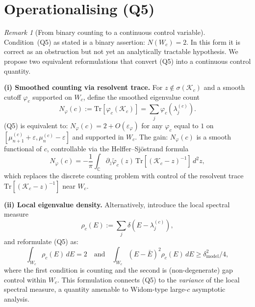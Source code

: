 \documentclass[12pt,a4paper]{amsart}
\theoremstyle{definition}
\theoremstyle{remark}
\newtheorem{remark}[theorem]{Remark}
\newcommand{\Kc}{\mathcal{K}_c}
\newcommand{\lam}[2]{\lambda_{#2}^{(#1)}}
\newcommand{\Tr}{\mathrm{Tr}}
\begin{document}
\section{Operationalising (Q5)}
\label{sec:Q5operationalise}

\begin{remark}[From binary counting to a continuous control variable]
\label{rem:Q5-operationalise}
Condition~(Q5) as stated is a binary assertion: $N(W_c) = 2$.
In this form it is correct as an obstruction but not yet an
analytically tractable hypothesis.
We propose two equivalent reformulations that convert (Q5) into
a continuous control quantity.

\medskip
\noindent\textbf{(i) Smoothed counting via resolvent trace.}
For $z \notin \sigma(\Kc)$ and a smooth cutoff $\varphi_c$
supported on $W_c$, define the smoothed eigenvalue count
\begin{equation}\label{eq:smoothcount}
  N_{\varphi}(c) := \Tr[\varphi_c(\Kc)]
  = \sum_j \varphi_c(\lam{c}{j}).
\end{equation}
(Q5) is equivalent to:
$N_{\varphi}(c) = 2 + O(\varepsilon_\varphi)$
for any $\varphi_c$ equal to $1$ on
$[\mu_{n+1}^{(c)}+\varepsilon, \mu_n^{(c)}-\varepsilon]$
and supported in $W_c$.
The gain: $N_\varphi(c)$ is a smooth functional of $c$,
controllable via the Helffer--Sj\"ostrand formula
\begin{equation}\label{eq:HS}
  N_\varphi(c) = -\frac{1}{\pi}\int_{\mathbb{C}}
  \partial_{\bar z}\tilde\varphi_c(z)\,
  \Tr[(\Kc - z)^{-1}]\,d^2z,
\end{equation}
which replaces the discrete counting problem with
control of the resolvent trace $\Tr[(\Kc-z)^{-1}]$ near $W_c$.

\medskip
\noindent\textbf{(ii) Local eigenvalue density.}
Alternatively, introduce the local spectral measure
\begin{equation}\label{eq:localdensity}
  \rho_c(E) := \sum_j \delta(E - \lam{c}{j}),
\end{equation}
and reformulate (Q5) as:
\begin{equation}\label{eq:Q5density}
  \int_{W_c} \rho_c(E)\,dE = 2
  \quad\text{and}\quad
  \int_{W_c} (E-\bar E)^2 \rho_c(E)\,dE \geq \delta_{\mathrm{model}}^2/4,
\end{equation}
where the first condition is counting and the second is
(non-degenerate) gap control within $W_c$.
This formulation connects (Q5) to the \emph{variance} of the
local spectral measure, a quantity amenable to
Widom-type large-$c$ asymptotic analysis.


\end{remark}
\end{document}
